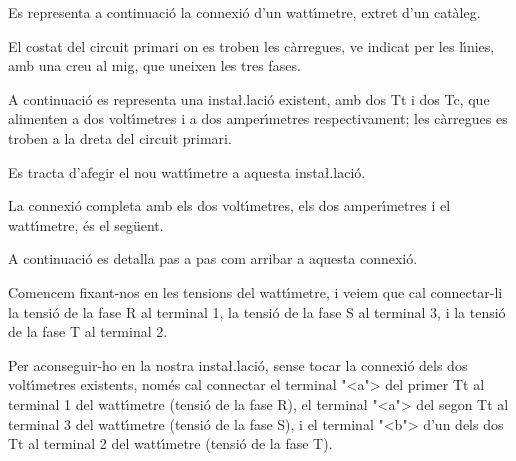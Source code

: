 \begin{exemple}
    Es representa a continuaci\'{o} la connexi\'{o} d'un watt\'{\i}metre, extret
    d'un cat\`{a}leg.

    El costat del circuit primari on es troben les c\`{a}rregues, ve indicat
    per les l\'{\i}nies, amb una creu al mig, que uneixen les tres fases.

    \begin{center}
        
    \end{center}

    A continuaci\'{o} es representa una insta{\l.l}aci\'{o} existent, amb dos Tt i
    dos Tc, que alimenten a dos volt\'{\i}metres i a dos amper\'{\i}metres
    respectivament; les c\`{a}rregues es troben a la dreta del circuit
    primari.

    Es tracta d'afegir el nou watt\'{\i}metre a aquesta
    insta{\l.l}aci\'{o}.

    \begin{center}
        
    \end{center}

    La connexi\'{o} completa amb els dos volt\'{\i}metres, els dos amper\'{\i}metres i el watt\'{\i}metre, \'{e}s el seg\"{u}ent.

    \begin{center}
        
    \end{center}

    A continuaci\'{o} es detalla pas a pas com arribar a aquesta connexi\'{o}.

    Comencem fixant-nos en les tensions del watt\'{\i}metre, i veiem que cal
    connectar-li la tensi\'{o} de la fase R al terminal 1, la tensi\'{o} de la
    fase S al terminal 3, i la tensi\'{o} de la fase T al terminal 2.

    Per aconseguir-ho en la nostra insta{\l.l}aci\'{o}, sense tocar la
    connexi\'{o} dels dos volt\'{\i}metres existents, nom\'{e}s cal connectar
    el terminal {"<}\textsf{a}{">} del primer Tt al terminal 1 del watt\'{\i}metre (tensi\'{o} de
    la fase R), el terminal {"<}\textsf{a}{">} del segon Tt al terminal 3 del watt\'{\i}metre
    (tensi\'{o} de la fase S), i el terminal {"<}\textsf{b}{">} d'un dels dos Tt
    al terminal 2 del watt\'{\i}metre (tensi\'{o} de la fase T).


\end{exemple}
